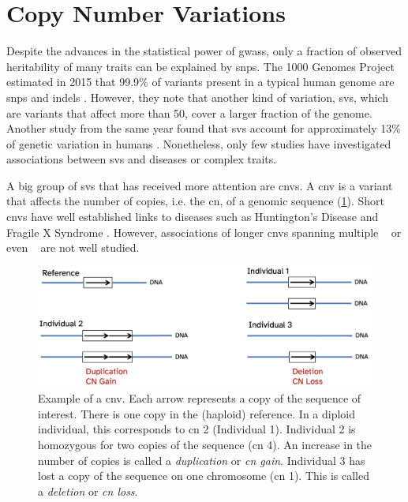 \documentclass[twoside=false]{scrbook}
\begin{document}
\section{Copy Number Variations}
Despite the advances in the statistical power of \glspl{gwas}, only a fraction of observed heritability of many traits can be explained by \glspl{snp}.
The 1000 Genomes Project estimated in 2015 that 99.9\% of variants present in a typical human genome are \glspl{snp} and \glspl{indel} \cite{Auton2015a}.
However, they note that another kind of variation, \glspl{sv}, which are variants that affect more than \qty{50}{\base}, cover a larger fraction of the genome.
Another study from the same year found that \glspl{sv} account for approximately 13\% of genetic variation in humans \cite{Sudmant2015}.
Nonetheless, only few studies have investigated associations between \glspl{sv} and diseases or complex traits.

A big group of \glspl{sv} that has received more attention are \glspl{cnv}.
A \gls{cnv} is a variant that affects the number of copies, i.e. the \gls{cn}, of a genomic sequence (\cref*{fig:cnv}).
Short \glspl{cnv} have well established links to diseases such as Huntington's Disease and Fragile X Syndrome \cite{MacDonald1993,Verkerk1991}.
However, associations of longer \glspl{cnv} spanning multiple \si{\kilo\base} or even \si{\mega\base} are not well studied.

\begin{figure}
    \centering
    \includegraphics[width=\textwidth]{img/cnv_example.png}
    \caption{Example of a \gls{cnv}.
        Each arrow represents a copy of the sequence of interest.
        There is one copy in the (haploid) reference.
        In a diploid individual, this corresponds to \gls{cn} 2 (Individual 1).
        Individual 2 is homozygous for two copies of the sequence (\gls{cn} 4).
        An increase in the number of copies is called a \textit{duplication} or \textit{\gls{cn} gain}.
        Individual 3 has lost a copy of the sequence on one chromosome (\gls{cn} 1).
        This is called a \textit{deletion} or \textit{\gls{cn} loss}.}
        \label{fig:cnv}
\end{figure}
\end{document}
